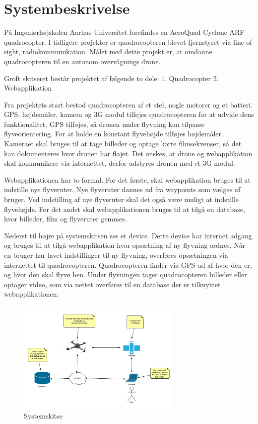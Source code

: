 \section{Systembeskrivelse}


På Ingeniørhøjskolen Aarhus Universitet forefindes en AeroQuad Cyclone ARF quadrocopter. I tidligere projekter er quadrocopteren blevet fjernstyret via line of sight, radiokommunikation. Målet med dette projekt er, at omdanne quadrocopteren til en autonom overvågnings drone.

Groft skitseret består projektet af følgende to dele: 
1. Quadrocopter
2. Webapplikation

Fra projektets start bestod quadrocopteren af et stel, nogle motorer og et batteri. GPS, højdemåler, kamera og 3G modul tilføjes quadrocopteren for at udvide dens funktionalitet. GPS tilføjes, så dronen under flyvning kan tilpasse flyveorientering. For at holde en konstant flyvehøjde tilføjes højdemåler. Kameraet skal bruges til at tage billeder og optage korte filmsekvenser, så det kan dokumenteres hvor dronen har fløjet. Det ønskes, at drone og webapplikation skal kommunikere via internettet, derfor udstyres dronen med et 3G modul.

Webapplikationen har to formål. For det første, skal webapplikation bruges til at indstille nye flyveruter. Nye flyveruter dannes ud fra waypoints som vælges af bruger. Ved indstilling af nye flyveruter skal det også være muligt at indstille flyvehøjde. For det andet skal webapplikationen bruges til at tilgå en database, hvor billeder, film og flyveruter gemmes.

Nederst til højre på systemskitsen ses et device. Dette device har internet adgang og bruges til at tilgå webapplikation hvor opsætning af ny flyvning ordnes.  Når en bruger har lavet indstillinger til ny flyvning, overføres opsætningen via internettet til quadrocopteren. Quadrocopteren finder via GPS ud af hvor den er, og hvor den skal flyve hen. Under flyvningen tager quadrocopteren billeder eller optager video, som via nettet overføres til en database der er tilknyttet webapplikationen.

\vspace{-5pt}
\begin{figure}[H]
\centering
\includegraphics[width=0.7\textwidth]{Billeder/Projektbeskrivelse.png}
\vspace{-5pt}
\caption{Systemskitse}
\label{fig:Systemskitse}
\end{figure}